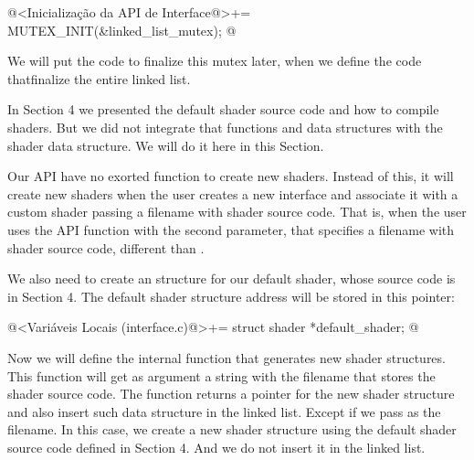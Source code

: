 \iniciocodigo
@<Inicialização da API de Interface@>+=
MUTEX_INIT(&linked_list_mutex);
@
\fimcodigo

We will put the code to finalize this mutex later, when we define the
code thatfinalize the entire linked list.


In Section 4 we presented the default shader source code and how to
compile shaders. But we did not integrate that functions and data
structures with the shader data structure. We will do it here in this
Section.

Our API have no exorted function to create new shaders. Instead of
this, it will create new shaders when the user creates a new interface
and associate it with a custom shader passing a filename with shader
source code. That is, when the user uses the API
function  with the second parameter,
that specifies a filename with shader source code, different
than .

We also need to create an structure for our default shader, whose
source code is in Section 4. The default shader structure address will
be stored in this pointer:

\iniciocodigo
@<Variáveis Locais (interface.c)@>+=
struct shader *default_shader;
@
\fimcodigo

Now we will define the internal function that generates new shader
structures. This function will get as argument a string with the
filename that stores the shader source code. The function returns a
pointer for the new shader structure and also insert such data
structure in the linked list. Except if we pass  as
the filename. In this case, we create a new shader structure using the
default shader source code defined in Section 4. And we do not insert
it in the linked list.

